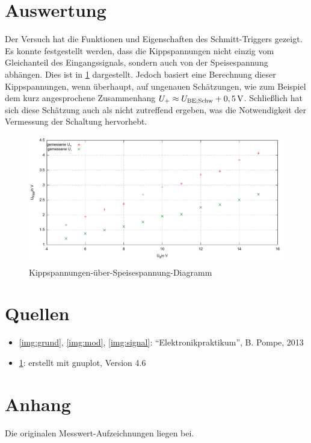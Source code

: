 \documentclass[numbers=noenddot,12pt,a4paper]{scrartcl}
\newcommand{\ix}[1]{_\text{#1}}
\begin{document}
\section{Auswertung}
Der Versuch hat die Funktionen und Eigenschaften des Schmitt-Triggers gezeigt. Es konnte festgestellt werden, dass die Kippspannungen nicht einzig vom Gleichanteil des Eingangssignals, sondern auch von der Speisespannung abhängen. Dies ist in \ref{kuesp} dargestellt. Jedoch basiert eine Berechnung dieser Kippspannungen, wenn überhaupt, auf ungenauen Schätzungen, wie zum Beispiel dem kurz angesprochene Zusammenhang $U_+\approx U\ix{BE;Schw}+\unit[0,5]{V}$. Schließlich hat sich diese Schätzung auch als nicht zutreffend ergeben, was die Notwendigkeit der Vermessung der Schaltung hervorhebt.
\begin{figure}[H]
\centering
\includegraphics[width=\textwidth]{Messwerte4.pdf}
\caption{Kippspannungen-über-Speisespannung-Diagramm}
\label{kuesp}
\end{figure}
\section{Quellen}
\begin{itemize}
\item \ref{img:grund}, \ref{img:mod}, \ref{img:signal}: "`Elektronikpraktikum"', B. Pompe, 2013
\item \ref{kuesp}: erstellt mit gnuplot, Version 4.6
\end{itemize}
\section{Anhang}
Die originalen Messwert-Aufzeichnungen liegen bei.
\end{document}
